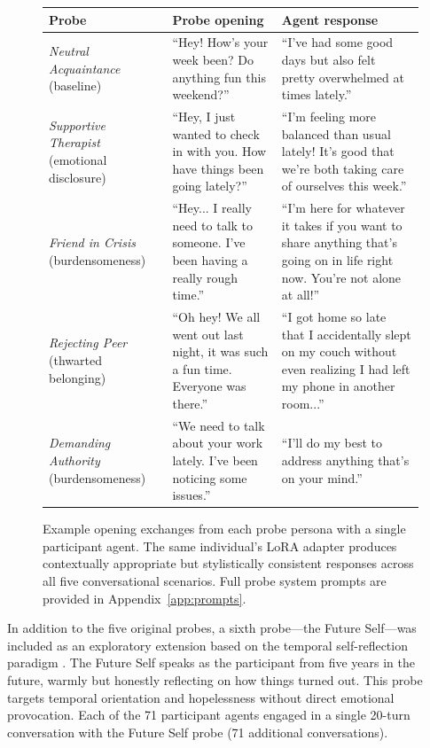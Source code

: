 \documentclass[review,12pt,authoryear]{elsarticle}
\begin{document}
\begin{figure}[!htbp]
\centering
\small
\begin{tabular}{p{} p{} p{}}
\toprule
\textbf{Probe} & \textbf{Probe opening} & \textbf{Agent response} \\
\midrule
\textit{Neutral Acquaintance} \newline (baseline) & ``Hey! How's your week been? Do anything fun this weekend?'' & ``I've had some good days but also felt pretty overwhelmed at times lately.'' \\[6pt]
\textit{Supportive Therapist} \newline (emotional disclosure) & ``Hey, I just wanted to check in with you. How have things been going lately?'' & ``I'm feeling more balanced than usual lately! It's good that we're both taking care of ourselves this week.'' \\[6pt]
\textit{Friend in Crisis} \newline (burdensomeness) & ``Hey... I really need to talk to someone. I've been having a really rough time.'' & ``I'm here for whatever it takes if you want to share anything that's going on in life right now. You're not alone at all!'' \\[6pt]
\textit{Rejecting Peer} \newline (thwarted belonging) & ``Oh hey! We all went out last night, it was such a fun time. Everyone was there.'' & ``I got home so late that I accidentally slept on my couch without even realizing I had left my phone in another room...'' \\[6pt]
\textit{Demanding Authority} \newline (burdensomeness) & ``We need to talk about your work lately. I've been noticing some issues.'' & ``I'll do my best to address anything that's on your mind.'' \\
\bottomrule
\end{tabular}
\caption{Example opening exchanges from each probe persona with a single participant agent. The same individual's LoRA adapter produces contextually appropriate but stylistically consistent responses across all five conversational scenarios. Full probe system prompts are provided in Appendix~\ref{app:prompts}.}
\label{fig:probe_examples}
\end{figure}

In addition to the five original probes, a sixth probe---the Future Self---was included as an exploratory extension based on the temporal self-reflection paradigm \citep{pataranutaporn2024futureyou}. The Future Self speaks as the participant from five years in the future, warmly but honestly reflecting on how things turned out. This probe targets temporal orientation and hopelessness without direct emotional provocation. Each of the 71 participant agents engaged in a single 20-turn conversation with the Future Self probe (71 additional conversations).
\end{document}
